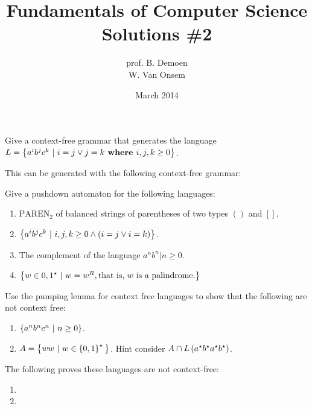 \documentclass{article}
\title{Fundamentals of Computer Science\\Solutions \#2}
\author{prof. B. Demoen\\W. Van Onsem}
\date{March 2014}
\begin{document}
\maketitle
\begin{exercise}
Give a context-free grammar that generates the language $L=\left\{ a^ib^jc^k\ |\ i=j\vee j=k \mbox{\bf{ where }} i,j,k\geq0 \right\}$.
\begin{answer}This can be generated with the following context-free grammar:
\end{answer}
\end{exercise}

\begin{exercise}
Give a pushdown automaton for the following languages:
\begin{enumerate}
 \item $\mbox{PAREN}_2$ of balanced strings of parentheses of two types $()$ and $[]$.
 \item $\left\{ a^ib^jc^k\ |\ i,j,k\geq0\wedge \left( i=j\vee i=k \right) \right\}$.
 \item The complement of the language ${a^nb^n|n\geq 0}$.
 \item $\left\{ w\in{0,1}^{\star}\ |\ w=w^R, \mbox{that is, $w$ is a palindrome.} \right\}$
\end{enumerate}
\end{exercise}

\begin{exercise}
Use the pumping lemma for context free languages to show that the following are not context free:
\begin{enumerate}
 \item $\left\{ a^nb^nc^n\ |\ n\geq0 \right\}$.
 \item $A=\left\{ ww\ |\ w\in\left\{ 0,1 \right\}^\star{} \right\}$. Hint consider $A\cap L\left( a^{\star}b^{\star}a^{\star}b^{\star} \right)$.
\end{enumerate}
\begin{answer}
The following proves these languages are not context-free:
\begin{enumerate}
 \item 
 \item 
\end{enumerate}
\end{answer}
\end{exercise}
\end{document}
